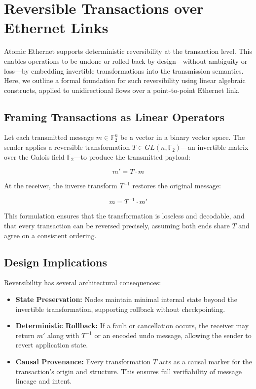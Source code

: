 \section{Reversible Transactions over Ethernet Links}

Atomic Ethernet supports deterministic reversibility at the transaction level. This enables operations to be undone or rolled back by design—without ambiguity or loss—by embedding invertible transformations into the transmission semantics. Here, we outline a formal foundation for such reversibility using linear algebraic constructs, applied to unidirectional flows over a point-to-point Ethernet link.

\subsection{Framing Transactions as Linear Operators}

Let each transmitted message $m \in \mathbb{F}_2^n$ be a vector in a binary vector space. The sender applies a reversible transformation $T \in GL(n, \mathbb{F}_2)$—an invertible matrix over the Galois field $\mathbb{F}_2$—to produce the transmitted payload:

\[
m' = T \cdot m
\]

At the receiver, the inverse transform $T^{-1}$ restores the original message:

\[
m = T^{-1} \cdot m'
\]

This formulation ensures that the transformation is loseless and decodable, and that every transaction can be reversed precisely, assuming both ends share $T$ and agree on a consistent ordering.

\subsection{Design Implications}

Reversibility has several architectural consequences:

\begin{itemize}
  \item \textbf{State Preservation:} Nodes maintain minimal internal state beyond the invertible transformation, supporting rollback without checkpointing.
  \item \textbf{Deterministic Rollback:} If a fault or cancellation occurs, the receiver may return $m'$ along with $T^{-1}$ or an encoded undo message, allowing the sender to revert application state.
  \item \textbf{Causal Provenance:} Every transformation $T$ acts as a causal marker for the transaction's origin and structure. This ensures full verifiability of message lineage and intent.
\end{itemize}

